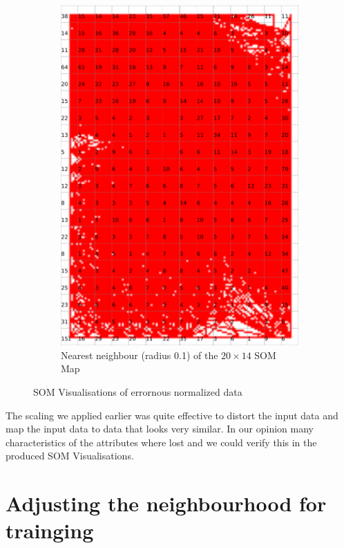 \documentclass{acm_proc_article-sp}
\begin{document}
\begin{figure}
\begin{subfigure}[b]{0.45\linewidth}
        \label{fig:wine-weird-activity-histogram}
    \end{subfigure}
    \begin{subfigure}[b]{0.45\linewidth}
        \includegraphics[width=\linewidth]{img/wine-weird-nearest-neighbour-radius}
        \caption{Nearest neighbour (radius 0.1) of the $20\times14$ SOM Map}
        \label{fig:wine-weird-nearest-neighbour-radius}
    \end{subfigure}
    \caption{SOM Visualisations of errornous normalized data}
\end{figure}

The scaling we applied earlier was quite effective to distort the input data
and map the input data to data that looks very similar. In our opinion
many characteristics of the attributes where lost and we could verify this
in the produced SOM Visualisations.

\section{Adjusting the neighbourhood for trainging}




\end{document}
